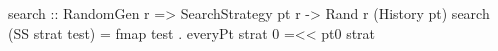 search :: RandomGen r
       => SearchStrategy pt r -> Rand r (History pt)
search (SS strat test) =
  fmap test . everyPt strat 0 =<< pt0 strat

